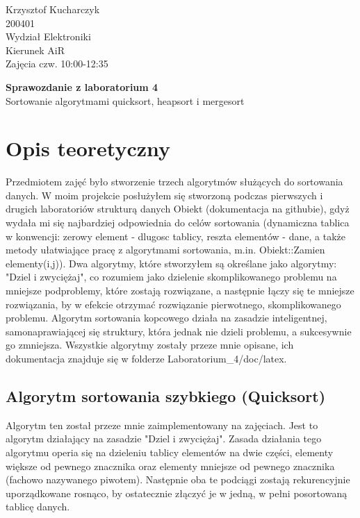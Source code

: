 \documentclass[a4paper,12pt]{article}
\begin{document}
{\raggedleft{}Krzysztof Kucharczyk}\\200401\\Wydział Elektroniki\\Kierunek AiR\\Zajęcia czw. 10:00-12:35

\begin{center} 
	\textbf{{\large Sprawozdanie z laboratorium 4}}\\Sortowanie algorytmami quicksort, heapsort i mergesort	
\end{center}

\section{Opis teoretyczny}

Przedmiotem zajęć było stworzenie trzech algorytmów służących do sortowania danych. W moim projekcie posłużyłem się stworzoną podczas pierwszych i drugich 
laboratoriów strukturą danych Obiekt (dokumentacja na githubie), gdyż wydała mi się najbardziej odpowiednia do celów sortowania (dynamiczna tablica w konwencji: zerowy element - dlugosc tablicy, reszta elementów - dane, a także metody ułatwiające pracę z algorytmami sortowania, m.in. Obiekt::Zamien elementy(i,j)). Dwa algorytmy, które stworzyłem
są określane jako algorytmy: "Dziel i zwyciężaj", co rozumiem jako dzielenie skomplikowanego problemu na mniejsze podproblemy, które zostają rozwiązane, a następnie
łączy się te mniejsze rozwiązania, by w efekcie otrzymać rozwiązanie pierwotnego, skomplikowanego problemu. Algorytm sortowania kopcowego działa na zasadzie 
inteligentnej, samonaprawiającej się struktury, która jednak nie dzieli problemu, a sukcesywnie go zmniejsza. Wszystkie algorytmy zostały przeze mnie opisane, ich 
dokumentacja znajduje się w folderze Laboratorium\_4/doc/latex.

\subsection{Algorytm sortowania szybkiego (Quicksort)}

Algorytm ten został przeze mnie zaimplementowany na zajęciach. Jest to algorytm działający na zasadzie "Dziel i zwyciężaj". Zasada działania tego algorytmu operia się
na dzieleniu tablicy elementów na dwie części, elementy większe od pewnego znacznika oraz elementy mniejsze od pewnego znacznika (fachowo nazywanego piwotem). Następnie oba te podciągi zostają
rekurencyjnie uporządkowane rosnąco, by ostatecznie złączyć je w jedną, w pełni posortowaną tablicę danych. 
\end{document}
